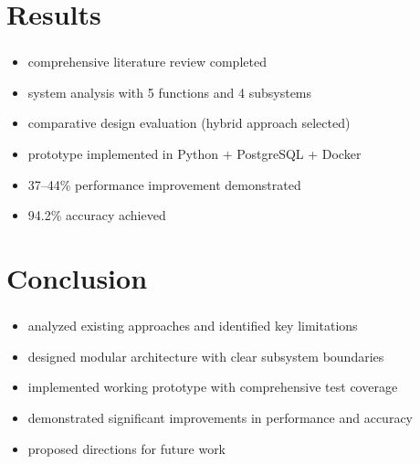 
\section{Results}

\begin{frame}
    \frametitle{\insertsection}

    \begin{itemize}
        \item comprehensive literature review completed
        \item system analysis with 5 functions and 4 subsystems
        \item comparative design evaluation (hybrid approach selected)
        \item prototype implemented in Python + PostgreSQL + Docker
        \item 37--44\% performance improvement demonstrated
        \item 94.2\% accuracy achieved
    \end{itemize}
\end{frame}


\section{Conclusion}

\begin{frame}
    \frametitle{\insertsection}

    \begin{itemize}
        \item analyzed existing approaches and identified key limitations
        \item designed modular architecture with clear subsystem boundaries
        \item implemented working prototype with comprehensive test coverage
        \item demonstrated significant improvements in performance and accuracy
        \item proposed directions for future work
    \end{itemize}
\end{frame}

